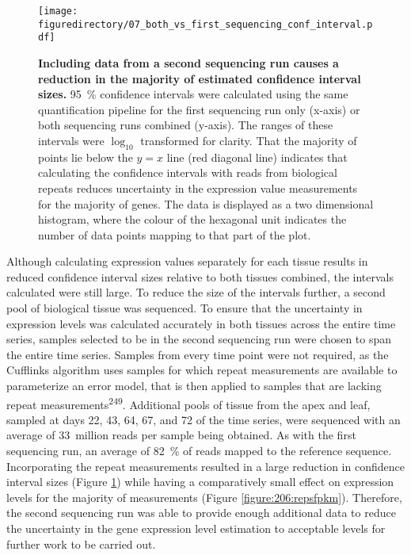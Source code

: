 \documentclass[12pt,]{book}
\begin{document}
\begin{figure}[htbp]
\centering
\texttt{[image: figuredirectory/07\_both\_vs\_first\_sequencing\_conf\_interval.pdf]}
\caption{\textbf{Including data from a second sequencing run causes a
reduction in the majority of estimated confidence interval sizes.} 95~\%
confidence intervals were calculated using the same quantification
pipeline for the first sequencing run only (x-axis) or both sequencing
runs combined (y-axis). The ranges of these intervals were \(\log_{10}\)
transformed for clarity. That the majority of points lie below the
\(y = x\) line (red diagonal line) indicates that calculating the
confidence intervals with reads from biological repeats reduces
uncertainty in the expression value measurements for the majority of
genes. The data is displayed as a two dimensional histogram, where the
colour of the hexagonal unit indicates the number of data points mapping
to that part of the plot.}\label{figure:207:repsconf}
\end{figure}

Although calculating expression values separately for each tissue
results in reduced confidence interval sizes relative to both tissues
combined, the intervals calculated were still large. To reduce the size
of the intervals further, a second pool of biological tissue was
sequenced. To ensure that the uncertainty in expression levels was
calculated accurately in both tissues across the entire time series,
samples selected to be in the second sequencing run were chosen to span
the entire time series. Samples from every time point were not required,
as the Cufflinks algorithm uses samples for which repeat measurements
are available to parameterize an error model, that is then applied to
samples that are lacking repeat measurements\textsuperscript{249}.
Additional pools of tissue from the apex and leaf, sampled at days 22,
43, 64, 67, and 72 of the time series, were sequenced with an average of
33~million reads per sample being obtained. As with the first sequencing
run, an average of 82~\% of reads mapped to the reference sequence.
Incorporating the repeat measurements resulted in a large reduction in
confidence interval sizes (Figure \ref{figure:207:repsconf}) while
having a comparatively small effect on expression levels for the
majority of measurements (Figure \ref{figure:206:repsfpkm}). Therefore,
the second sequencing run was able to provide enough additional data to
reduce the uncertainty in the gene expression level estimation to
acceptable levels for further work to be carried out.
\end{document}
